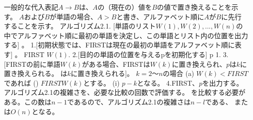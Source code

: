 
一般的な代入表記$A \rightarrow B$は、$A$の（現在の）値を$B$の値で置き換えることを示す。
$A$および$B$が単語の場合、$A > B$と書き、アルファベット順に$A$が$B$に先行することを示す。
アルゴリズム2.1.
[単語のリスト$W(1), W(2), ..., W(n)$の中でアルファベット順に最初の単語を決定し、この単語とリスト内の位置を出力する] 。
1.[初期状態では、FIRSTは現在の最初の単語をアルファベット順に表す] 。
FIRST $W(1).$
2.[目的の単語の位置を与えるpを初期化する] p 1.
3.[FIRSTの前に単語$W(k)$がある場合、FIRSTは$W(k)$に置き換えられ、$p$は$k$に置き換えられる。
は$k$に置き換えられる]。
$k=2～n$の場合
(a) $W(k)< FIRST$であれば
() $FIRST W(k)$とする。
(i) $p- k$となる。
4.FIRST、$p$を出力する。
アルゴリズム2.1の複雑さを、必要な比較の回数で評価する。
を比較する必要がある。この数は$n-1$であるので、アルゴリズム2.1の複雑さは$n-l$である、
または$O(n)$となる。